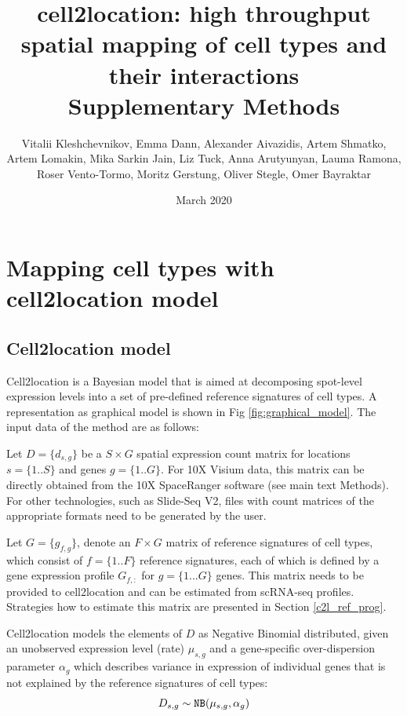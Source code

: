 \documentclass[11pt,a4paper]{article}
\title{cell2location: high throughput spatial mapping of cell types and their interactions \\
Supplementary Methods
}
\author{Vitalii Kleshchevnikov, Emma Dann, Alexander Aivazidis, Artem Shmatko, Artem Lomakin, Mika Sarkin Jain, Liz Tuck, Anna Arutyunyan, Lauma Ramona, Roser Vento-Tormo, Moritz Gerstung, Oliver Stegle, Omer Bayraktar}
\date{March 2020}
\begin{document}
\maketitle

\tableofcontents

\section{Mapping cell types with cell2location model}

\subsection{Cell2location model} \label{cell2location_model}

Cell2location is a Bayesian model that is aimed at decomposing spot-level expression levels into a set of pre-defined reference signatures of cell types. A representation as graphical model is shown in Fig \ref{fig:graphical_model}. The input data of the method are as follows: \newline

Let $D=\{d_{s,g}\}$ be a $S \times G$ spatial expression count matrix for locations $s=\{1..S\}$ and genes $g=\{1..G\}$. 
For 10X Visium data, this matrix can be directly obtained from the 10X SpaceRanger software (see main text Methods). For other technologies, such as Slide-Seq V2, files with count matrices of the appropriate formats need to be generated by the user. \newline

Let $G=\{g_{f,g}\}$, denote an $F \times G$ matrix of reference signatures of cell types, which consist of $f=\{1..F\}$ reference signatures, each of which is defined by a gene expression profile $G_{f,:}$ for $g=\{1...G\}$ genes. This matrix needs to be provided to cell2location and can be estimated from scRNA-seq profiles. Strategies how to estimate this matrix are presented in Section \ref{c2l_ref_prog}. \newline

Cell2location models the elements of $D$ as Negative Binomial distributed, given an unobserved expression level (rate) $\mu_{s,g}$ and a gene-specific over-dispersion parameter $\alpha_g$ which describes variance in expression of individual genes that is not explained by the reference signatures of cell types: 
\begin{equation} \label{eq:c2l:1}
D_{s,g} \sim \mathtt{NB}(\mu_{s,g}, \alpha_g) \\
\end{equation}
\end{document}
